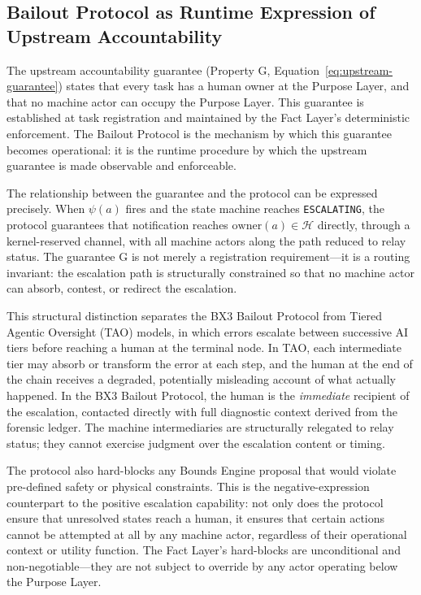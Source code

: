 \subsection{Bailout Protocol as Runtime Expression of Upstream Accountability}
\label{sec:upstream-guarantee}

The upstream accountability guarantee (Property G, Equation~\ref{eq:upstream-guarantee}) states that every task has a human owner at the Purpose Layer, and that no machine actor can occupy the Purpose Layer. This guarantee is established at task registration and maintained by the Fact Layer's deterministic enforcement. The Bailout Protocol is the mechanism by which this guarantee becomes operational: it is the runtime procedure by which the upstream guarantee is made observable and enforceable.

The relationship between the guarantee and the protocol can be expressed precisely. When $\psi(a)$ fires and the state machine reaches \texttt{ESCALATING}, the protocol guarantees that notification reaches $\text{owner}(a) \in \mathcal{H}$ directly, through a kernel-reserved channel, with all machine actors along the path reduced to relay status. The guarantee G is not merely a registration requirement---it is a routing invariant: the escalation path is structurally constrained so that no machine actor can absorb, contest, or redirect the escalation.

This structural distinction separates the BX3 Bailout Protocol from Tiered Agentic Oversight (TAO) models, in which errors escalate between successive AI tiers before reaching a human at the terminal node. In TAO, each intermediate tier may absorb or transform the error at each step, and the human at the end of the chain receives a degraded, potentially misleading account of what actually happened. In the BX3 Bailout Protocol, the human is the \textit{immediate} recipient of the escalation, contacted directly with full diagnostic context derived from the forensic ledger. The machine intermediaries are structurally relegated to relay status; they cannot exercise judgment over the escalation content or timing.

The protocol also hard-blocks any Bounds Engine proposal that would violate pre-defined safety or physical constraints. This is the negative-expression counterpart to the positive escalation capability: not only does the protocol ensure that unresolved states reach a human, it ensures that certain actions cannot be attempted at all by any machine actor, regardless of their operational context or utility function. The Fact Layer's hard-blocks are unconditional and non-negotiable---they are not subject to override by any actor operating below the Purpose Layer.

